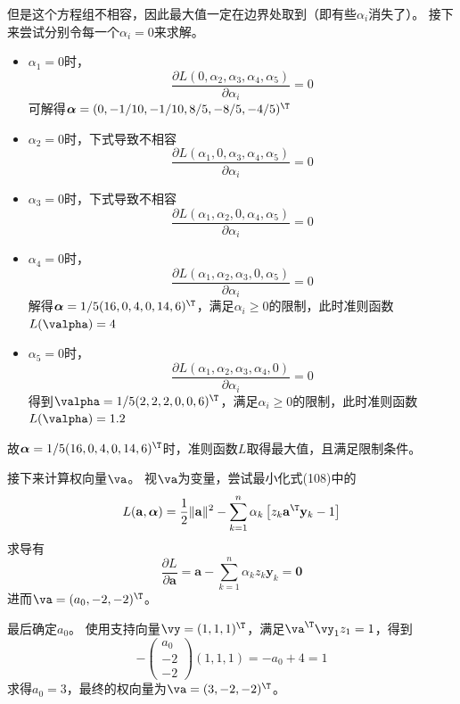 \documentclass[reportComp]{thesis}
\begin{document}
\begin{answer}
\begin{itemize}
	但是这个方程组不相容，因此最大值一定在边界处取到（即有些$\alpha_i$消失了）。
	接下来尝试分别令每一个$\alpha_i=0$来求解。
	\begin{itemize}
	\item $\alpha_1=0$时，
	\[\frac{\partial L\left(0, \alpha_{2}, \alpha_{3}, \alpha_{4}, \alpha_{5}\right)}{\partial \alpha_{i}}=0\]
	可解得$\boldsymbol{\alpha}=(0,-1/10,-1/10,8/5,-8/5,-4/5)^\T $
	\item $\alpha_2=0$时，下式导致不相容
	\[\frac{\partial L\left(\alpha_{1}, 0, \alpha_{3}, \alpha_{4}, \alpha_{5}\right)}{\partial \alpha_{i}}=0\]
	\item $\alpha_3=0$时，下式导致不相容
	\[\frac{\partial L\left(\alpha_{1}, \alpha_{2}, 0, \alpha_{4}, \alpha_{5}\right)}{\partial \alpha_{i}}=0\]
	\item $\alpha_4=0$时，
	\[\frac{\partial L\left(\alpha_{1}, \alpha_{2}, \alpha_{3}, 0, \alpha_{5}\right)}{\partial \alpha_{i}}=0\]
	解得$\boldsymbol{\alpha}=1/5(16,0,4,0,14,6)^\T $，满足$\alpha_i\geq 0$的限制，此时准则函数$L(\valpha)=4$
	\item $\alpha_5=0$时，
	\[\frac{\partial L\left(\alpha_{1}, \alpha_{2}, \alpha_{3}, \alpha_{4}, 0\right)}{\partial \alpha_{i}}=0\]
	得到$\valpha=1 / 5(2,2,2,0,0,6)^\T $，满足$\alpha_i\geq 0$的限制，此时准则函数$L(\valpha)=1.2$
	\end{itemize}
	故$\boldsymbol{\alpha}=1/5(16,0,4,0,14,6)^\T $时，准则函数$L$取得最大值，且满足限制条件。

	接下来计算权向量$\va$。
	视$\va$为变量，尝试最小化式(108)中的
	\[L(\mathbf{a}, \boldsymbol{\alpha})=\frac{1}{2}\|\mathbf{a}\|^{2}-\sum_{k=1}^{n} \alpha_{k}\left[z_{k} \mathbf{a}^\T  \mathbf{y}_{k}-1\right]\]
	求导有
	\[\frac{\partial L}{\partial \mathbf{a}}=\mathbf{a}-\sum_{k=1}^{n} \alpha_{k} z_{k} \mathbf{y}_{k}=\mathbf{0}\]
	进而$\va=(a_0,-2,-2)^\T $。

	最后确定$a_0$。
	使用支持向量$\vy=(1,1,1)^\T $，满足$\va^\T \vy_1z_1=1$，得到
	\[-\left(\begin{array}{c}{a_0} \\ {-2} \\ {-2}\end{array}\right)(1,1,1)=-a_{0}+4=1\]
	求得$a_0=3$，最终的权向量为$\va=(3,-2,-2)^\T $。
\end{itemize}
\end{answer}
\end{document}

